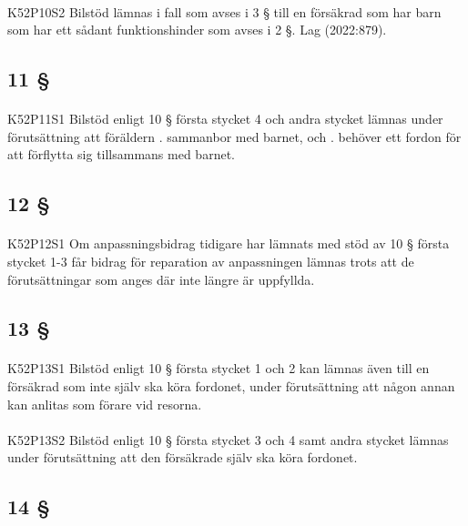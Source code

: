 \documentclass[a4paper,notitlepage,openany,10pt]{book}
\begin{document}
\paragraph*{}
{\tiny K52P10S2}
Bilstöd lämnas i fall som avses i 3 § till en försäkrad som har barn som har ett sådant funktionshinder som avses i 2 §.
Lag (2022:879).
\subsection*{11 §}
\paragraph*{}
{\tiny K52P11S1}
Bilstöd enligt 10 § första stycket 4 och andra stycket lämnas under förutsättning att föräldern
. sammanbor med barnet, och
. behöver ett fordon för att förflytta sig tillsammans med barnet.
\subsection*{12 §}
\paragraph*{}
{\tiny K52P12S1}
Om anpassningsbidrag tidigare har lämnats med stöd av 10 § första stycket 1-3 får bidrag för reparation av anpassningen lämnas trots att de förutsättningar som anges där inte längre är uppfyllda.
\subsection*{13 §}
\paragraph*{}
{\tiny K52P13S1}
Bilstöd enligt 10 § första stycket 1 och 2 kan lämnas även till en försäkrad som inte själv ska köra fordonet, under förutsättning att någon annan kan anlitas som förare vid resorna.
\paragraph*{}
{\tiny K52P13S2}
Bilstöd enligt 10 § första stycket 3 och 4 samt andra stycket lämnas under förutsättning att den försäkrade själv ska köra fordonet.
\subsection*{14 §}
\end{document}
